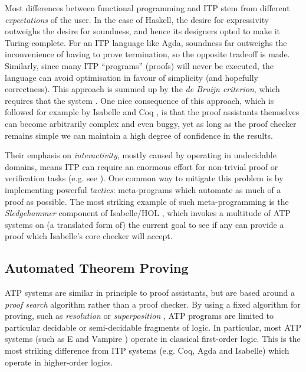 Most differences between functional programming and ITP stem from different \emph{expectations} of the user. In the case of Haskell, the desire for expressivity outweighs the desire for soundness, and hence its designers opted to make it Turing-complete. For an ITP language like Agda, soundness far outweighs the inconvenience of having to prove termination, so the opposite tradeoff is made. Similarly, since many ITP ``programs'' (proofs) will never be executed, the language can avoid optimisation in favour of simplicity (and hopefully correctness). This approach is summed up by the \emph{de Bruijn criterion}, which requires that the system  \cite[\S~2]{barendregt2001proof}. One nice consequence of this approach, which is followed for example by Isabelle \citep{nipkow2002isabelle} and Coq \citep{bertot2013interactive}, is that the proof assistants themselves can become arbitrarily complex and even buggy, yet as long as the proof checker remains simple we can maintain a high degree of confidence in the results.

Their emphasis on \emph{interactivity}, mostly caused by operating in undecidable domains, means ITP can require an enormous effort for non-trivial proof or verification tasks (e.g. see \citep{hales2015formal}). One common way to mitigate this problem is by implementing powerful \emph{tactics}: meta-programs which automate as much of a proof as possible. The most striking example of such meta-programming is the \emph{Sledgehammer} component of Isabelle/HOL \citep{journals/iandc/MengQP06}, which invokes a multitude of ATP systems on (a translated form of) the current goal to see if any can provide a proof which Isabelle's core checker will accept.

\subsection{Automated Theorem Proving}
\label{atp}

ATP systems are similar in principle to proof assistants, but are based around a \emph{proof search} algorithm rather than a proof checker. By using a fixed algorithm for proving, such as \emph{resolution} \cite[\S~9.6]{Russell:2003:AIM:773294} or \emph{superposition} \citep{bachmair1994rewrite}, ATP programs are limited to particular decidable or semi-decidable fragments of logic. In particular, most ATP systems (such as E \citep{schulz2013system} and Vampire \citep{riazanov2003implementing}) operate in classical first-order logic. This is the most striking difference from ITP systems (e.g. Coq, Agda and Isabelle) which operate in higher-order logics.

